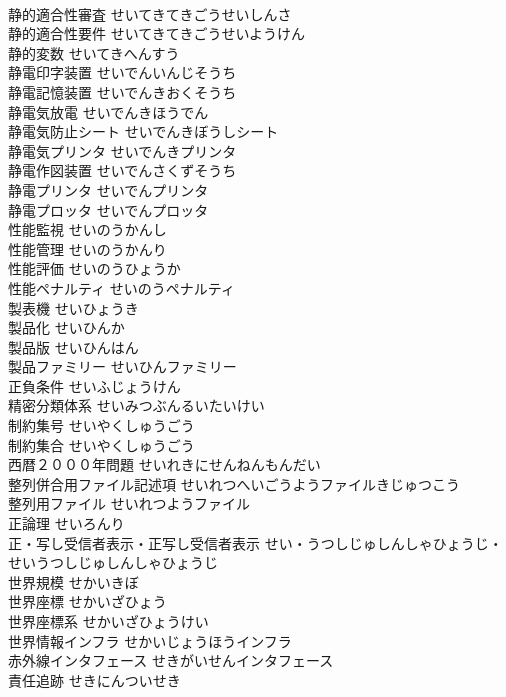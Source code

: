 \documentclass[8pt]{extreport}
\begin{document}
\begin{CJK}{UTF8}{min}
\\	静的適合性審査	せいてきてきごうせいしんさ	
\\	静的適合性要件	せいてきてきごうせいようけん	
\\	静的変数	せいてきへんすう	
\\	静電印字装置	せいでんいんじそうち	
\\	静電記憶装置	せいでんきおくそうち	
\\	静電気放電	せいでんきほうでん	
\\	静電気防止シート	せいでんきぼうしシート	
\\	静電気プリンタ	せいでんきプリンタ	
\\	静電作図装置	せいでんさくずそうち	
\\	静電プリンタ	せいでんプリンタ	
\\	静電プロッタ	せいでんプロッタ	
\\	性能監視	せいのうかんし	
\\	性能管理	せいのうかんり	
\\	性能評価	せいのうひょうか	
\\	性能ペナルティ	せいのうペナルティ	
\\	製表機	せいひょうき	
\\	製品化	せいひんか	
\\	製品版	せいひんはん	
\\	製品ファミリー	せいひんファミリー	
\\	正負条件	せいふじょうけん	
\\	精密分類体系	せいみつぶんるいたいけい	
\\	制約集号	せいやくしゅうごう	
\\	制約集合	せいやくしゅうごう	
\\	西暦２０００年問題	せいれきにせんねんもんだい	
\\	整列併合用ファイル記述項	せいれつへいごうようファイルきじゅつこう	
\\	整列用ファイル	せいれつようファイル	
\\	正論理	せいろんり	
\\	正・写し受信者表示・正写し受信者表示	せい・うつしじゅしんしゃひょうじ・せいうつしじゅしんしゃひょうじ	
\\	世界規模	せかいきぼ	
\\	世界座標	せかいざひょう	
\\	世界座標系	せかいざひょうけい	
\\	世界情報インフラ	せかいじょうほうインフラ	
\\	赤外線インタフェース	せきがいせんインタフェース	
\\	責任追跡	せきにんついせき	

\end{CJK}
\end{document}

